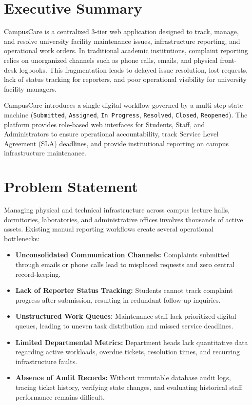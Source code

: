 \documentclass[12pt, a4paper]{article}
\begin{document}
\newpage
\tableofcontents
\newpage

\section{Executive Summary}
CampusCare is a centralized 3-tier web application designed to track, manage, and resolve university facility maintenance issues, infrastructure reporting, and operational work orders. In traditional academic institutions, complaint reporting relies on unorganized channels such as phone calls, emails, and physical front-desk logbooks. This fragmentation leads to delayed issue resolution, lost requests, lack of status tracking for reporters, and poor operational visibility for university facility managers.

CampusCare introduces a single digital workflow governed by a multi-step state machine (\texttt{Submitted}, \texttt{Assigned}, \texttt{In Progress}, \texttt{Resolved}, \texttt{Closed}, \texttt{Reopened}). The platform provides role-based web interfaces for Students, Staff, and Administrators to ensure operational accountability, track Service Level Agreement (SLA) deadlines, and provide institutional reporting on campus infrastructure maintenance.

\section{Problem Statement}
Managing physical and technical infrastructure across campus lecture halls, dormitories, laboratories, and administrative offices involves thousands of active assets. Existing manual reporting workflows create several operational bottlenecks:

\begin{itemize}[leftmargin=*]
    \item \textbf{Unconsolidated Communication Channels:} Complaints submitted through emails or phone calls lead to misplaced requests and zero central record-keeping.
    \item \textbf{Lack of Reporter Status Tracking:} Students cannot track complaint progress after submission, resulting in redundant follow-up inquiries.
    \item \textbf{Unstructured Work Queues:} Maintenance staff lack prioritized digital queues, leading to uneven task distribution and missed service deadlines.
    \item \textbf{Limited Departmental Metrics:} Department heads lack quantitative data regarding active workloads, overdue tickets, resolution times, and recurring infrastructure faults.
    \item \textbf{Absence of Audit Records:} Without immutable database audit logs, tracing ticket history, verifying state changes, and evaluating historical staff performance remains difficult.
\end{itemize}
\end{document}
